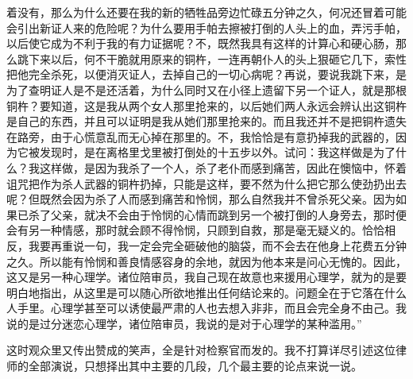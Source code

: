 着没有，那么为什么还要在我的新的牺牲品旁边忙碌五分钟之久，何况还冒着可能会引出新证人来的危险呢？为什么要用手帕去擦被打倒的人头上的血，弄污手帕，以后使它成为不利于我的有力证据呢？不，既然我具有这样的计算心和硬心肠，那么跳下来以后，何不干脆就用原来的铜杵，一连再朝仆人的头上狠砸它几下，索性把他完全杀死，以便消灭证人，去掉自己的一切心病呢？再说，要说我跳下来，是为了查明证人是不是还活着，为什么同时又在小径上遗留下另一个证人，就是那根铜杵？要知道，这是我从两个女人那里抢来的，以后她们两人永远会辨认出这铜杵是自己的东西，并且可以证明是我从她们那里抢来的。而且我还并不是把铜杵遗失在路旁，由于心慌意乱而无心掉在那里的。不，我恰恰是有意扔掉我的武器的，因为它被发现时，是在离格里戈里被打倒处的十五步以外。试问：我这样做是为了什么？我这样做，是因为我杀了一个人，杀了老仆而感到痛苦，因此在懊恼中，怀着诅咒把作为杀人武器的铜杵扔掉，只能是这样，要不然为什么把它那么使劲扔出去呢？但既然会因为杀了人而感到痛苦和怜悯，那么自然我并不曾杀死父亲。因为如果已杀了父亲，就决不会由于怜悯的心情而跳到另一个被打倒的人身旁去，那时便会有另一种情感，那时就会顾不得怜悯，只顾到自救，那是毫无疑义的。恰恰相反，我要再重说一句，我一定会完全砸破他的脑袋，而不会去在他身上花费五分钟之久。所以能有怜悯和善良情感容身的余地，就因为他本来是问心无愧的。因此，这又是另一种心理学。诸位陪审员，我自己现在故意也来援用心理学，就为的是要明白地指出，从这里是可以随心所欲地推出任何结论来的。问题全在于它落在什么人手里。心理学甚至可以诱使最严肃的人也去想入非非，而且会完全身不由己。我说的是过分迷恋心理学，诸位陪审员，我说的是对于心理学的某种滥用。”
\par 这时观众里又传出赞成的笑声，全是针对检察官而发的。我不打算详尽引述这位律师的全部演说，只想择出其中主要的几段，几个最主要的论点来说一说。
